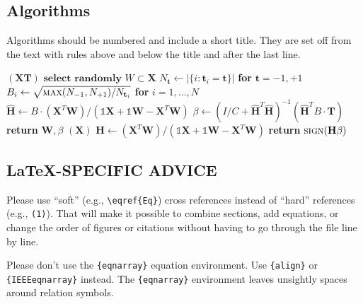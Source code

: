 \documentclass{ieeetmlcn}
\begin{document}
\subsection{Algorithms}
Algorithms should be numbered and include a short title.
They are set off from the text with rules above and below the title and after the last line.
\begin{algorithm}[H]
\caption{Weighted Tanimoto ELM.}\label{alg:alg1}
\begin{algorithmic}
\STATE 
{}$(\mathbf{X} \mathbf{T})$
\STATE \hspace{0.5cm}$ \textbf{select randomly } W \subset \mathbf{X}  $
\STATE \hspace{0.5cm}$ N_\mathbf{t} \gets | \{ i : \mathbf{t}_i = \mathbf{t} \} | $ \textbf{ for } $ \mathbf{t}= -1,+1 $
\STATE \hspace{0.5cm}$ B_i \gets \sqrt{ \textsc{max}(N_{-1},N_{+1}) / N_{\mathbf{t}_i} } $ \textbf{ for } $ i = 1,...,N $
\STATE \hspace{0.5cm}$ \hat{\mathbf{H}} \gets  B \cdot (\mathbf{X}^T\textbf{W})/( \mathbb{1}\mathbf{X} + \mathbb{1}\textbf{W} - \mathbf{X}^T\textbf{W} ) $
\STATE \hspace{0.5cm}$ \beta \gets \left ( I/C + \hat{\mathbf{H}}^T\hat{\mathbf{H}} \right )^{-1}(\hat{\mathbf{H}}^T B\cdot \mathbf{T})  $
\STATE \hspace{0.5cm}\textbf{return} $\textbf{W},  \beta $
\STATE 
{}$(\mathbf{X} )$
\STATE \hspace{0.5cm}$ \mathbf{H} \gets  (\mathbf{X}^T\textbf{W} )/( \mathbb{1}\mathbf{X}  + \mathbb{1}\textbf{W}- \mathbf{X}^T\textbf{W}  ) $
\STATE \hspace{0.5cm}\textbf{return}  $\textsc{sign}( \mathbf{H} \beta )$
\end{algorithmic}
\label{alg1}
\end{algorithm}

\subsection{\LaTeX-SPECIFIC ADVICE}

Please use ``soft'' (e.g., \verb|\eqref{Eq}|) cross references instead
of ``hard'' references (e.g., \verb|(1)|). That will make it possible
to combine sections, add equations, or change the order of figures or
citations without having to go through the file line by line.

Please don't use the \verb|{eqnarray}| equation environment. Use
\verb|{align}| or \verb|{IEEEeqnarray}| instead. The \verb|{eqnarray}|
environment leaves unsightly spaces around relation symbols.
\end{document}
